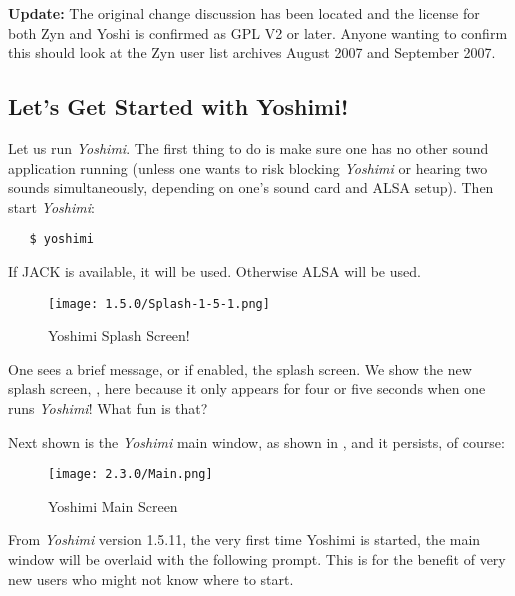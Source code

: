\documentclass[
 11pt,
 twoside,
 a4paper,
 final                                 %
]{article}
\begin{document}
      \textbf{Update:} The original change discussion has been located and the
      license for both Zyn and Yoshi is confirmed as GPL V2 or later. Anyone
      wanting to confirm this should look at the Zyn user list archives
      August 2007 and September 2007.


\subsection{Let's Get Started with Yoshimi!}
\label{subsec:introduction_lets_get_started}

   Let us run \textsl{Yoshimi}.
   The first
   thing to do is make sure one has no other sound application running
   (unless one wants to risk blocking \textsl{Yoshimi} or hearing two sounds
   simultaneously, depending on one's sound card and ALSA setup).
   Then start \textsl{Yoshimi}:

\begin{verbatim}
   $ yoshimi
\end{verbatim}

   If JACK is available, it will be used.  Otherwise ALSA will be used.

\begin{figure}[H]
   \centering
   \texttt{[image: 1.5.0/Splash-1-5-1.png]}
   \caption{Yoshimi Splash Screen!}
   \label{fig:yoshimi_splash_screen}
\end{figure}

   One sees a brief message, or if enabled, the splash screen.
   We show the new splash screen, ,
   here because it only appears for four or five seconds when one runs
   \textsl{Yoshimi}! What fun is that?

   Next shown is the \textsl{Yoshimi} main window,
   as shown in ,
   and it persists, of course:

\begin{figure}[H]
   \centering
   \texttt{[image: 2.3.0/Main.png]}
   \caption{Yoshimi Main Screen}
   \label{fig:yoshimi_main_screen}
\end{figure}

    From \textsl{Yoshimi} version 1.5.11, the very first time Yoshimi is
    started, the main window will be overlaid with the following prompt. This
    is for the benefit of very new users who might not know where to start.
\end{document}
